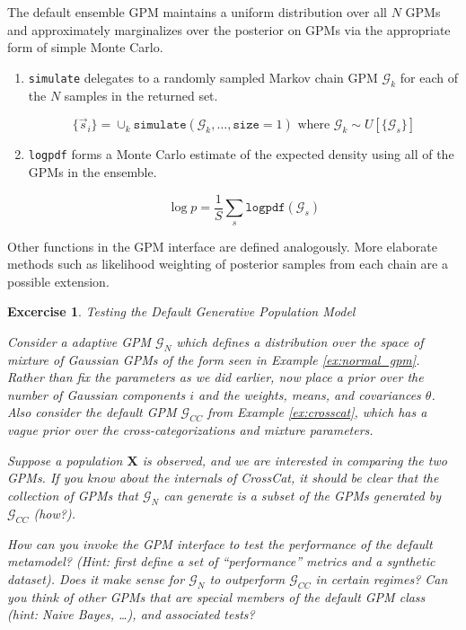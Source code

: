 \documentclass[10pt,letterpaper]{article}
\newtheorem{excercise}{Excercise}[section]
\newcommand{\set}[1]{\{#1\}}
\newcommand{\G}{\mathcal{G}}
\begin{document}
The default ensemble GPM maintains a uniform distribution over all $N$ GPMs and
approximately marginalizes over the posterior on GPMs via the appropriate form
of simple Monte Carlo.

\begin{enumerate}
\item \texttt{simulate} delegates to a randomly sampled Markov chain GPM
$\G_k$ for each of the $N$ samples in the returned set.

    $$
    \set{\vec{s}_i} = \cup_k \texttt{simulate}
    (\G_k,\dots,\texttt{size} = 1) \text{ where }
    \G_k \sim U[\set{\G_s}]
    $$

\item \texttt{logpdf} forms a Monte Carlo estimate of the expected density using
all of the GPMs in the ensemble.

    $$
    \log p = \frac{1}{S}\sum_s\texttt{logpdf}(\G_s)
    $$
\end{enumerate}

Other functions in the GPM interface are defined analogously. More elaborate
methods such as likelihood weighting of posterior samples from each chain are a
possible extension.

\begin{excercise} \label{ex:normal_vs_normal} Testing the Default Generative
Population Model

    Consider a adaptive GPM $\G_N$ which defines a distribution over
    the space of mixture of Gaussian GPMs of the form seen in Example
    \ref{ex:normal_gpm}. Rather than fix the parameters as we did earlier, now
    place a prior over the number of Gaussian components $i$ and the weights,
    means, and covariances $\theta$. Also consider the default GPM
    $\G_{CC}$ from Example \ref{ex:crosscat}, which has a vague prior
    over the cross-categorizations and mixture parameters.

    Suppose a population $\mathbf{X}$ is observed, and we are interested in
    comparing the two GPMs. If you know about the internals of CrossCat, it
    should be clear that the collection of GPMs that $\G_N$ can
    generate is a subset of the GPMs generated by $\G_{CC}$ (how?).

    How can you invoke the GPM interface to test the performance of the default
    metamodel? (Hint: first define a set of ``performance'' metrics and a
    synthetic dataset). Does it make sense for $\G_N$ to outperform
    $\G_{CC}$ in certain regimes? Can you think of other GPMs that are
    special members of the default GPM class (hint: Naive Bayes, \dots), and
    associated tests?
\end{excercise}
\end{document}
